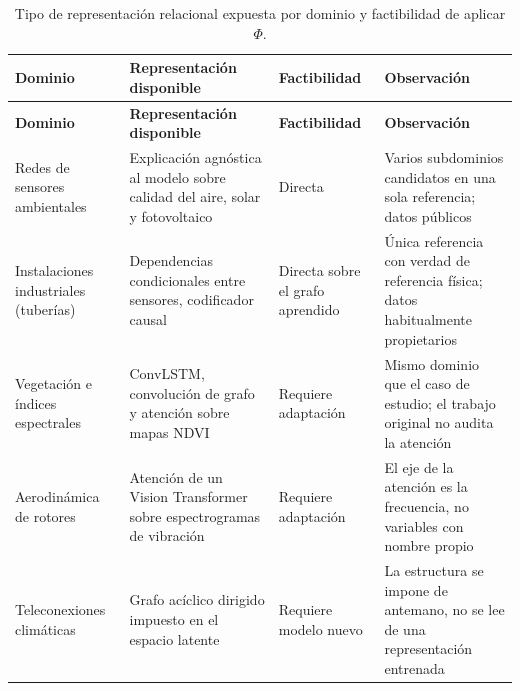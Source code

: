 {\small
\begin{longtable}{P{0.21}P{0.31}P{0.19}P{0.29}}
\caption{Tipo de representación relacional expuesta por dominio y factibilidad de aplicar $\Phi$.}\label{tab:dominios}\\
\toprule
\textbf{Dominio} & \textbf{Representación disponible} & \textbf{Factibilidad} & \textbf{Observación}\\
\midrule
\endfirsthead
\toprule
\textbf{Dominio} & \textbf{Representación disponible} & \textbf{Factibilidad} & \textbf{Observación}\\
\midrule
\endhead
Redes de sensores ambientales & Explicación agnóstica al modelo sobre calidad del aire, solar y fotovoltaico \cite{spatiotemporal2024e2e} & Directa & Varios subdominios candidatos en una sola referencia; datos públicos\\
Instalaciones industriales (tuberías) & Dependencias condicionales entre sensores, codificador causal \cite{pipeline2026causalgraph} & Directa sobre el grafo aprendido & Única referencia con verdad de referencia física; datos habitualmente propietarios\\
Vegetación e índices espectrales & ConvLSTM, convolución de grafo y atención sobre mapas NDVI \cite{convlstmgcn2026vegetation} & Requiere adaptación & Mismo dominio que el caso de estudio; el trabajo original no audita la atención\\
Aerodinámica de rotores & Atención de un Vision Transformer sobre espectrogramas de vibración \cite{rotorcraft2026vortexring} & Requiere adaptación & El eje de la atención es la frecuencia, no variables con nombre propio\\
Teleconexiones climáticas & Grafo acíclico dirigido impuesto en el espacio latente \cite{teleconnections2026causal} & Requiere modelo nuevo & La estructura se impone de antemano, no se lee de una representación entrenada\\
\bottomrule
\end{longtable}
}
